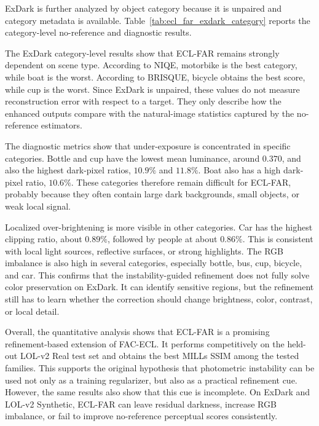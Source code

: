 ExDark is further analyzed by object category because it is unpaired and category metadata is available. Table~\ref{tab:ecl_far_exdark_category} reports the category-level no-reference and diagnostic results.



The ExDark category-level results show that ECL-FAR remains strongly dependent on scene type. According to NIQE, motorbike is the best category, while boat is the worst. According to BRISQUE, bicycle obtains the best score, while cup is the worst. Since ExDark is unpaired, these values do not measure reconstruction error with respect to a target. They only describe how the enhanced outputs compare with the natural-image statistics captured by the no-reference estimators.

The diagnostic metrics show that under-exposure is concentrated in specific categories. Bottle and cup have the lowest mean luminance, around $0.370$, and also the highest dark-pixel ratios, $10.9\%$ and $11.8\%$. Boat also has a high dark-pixel ratio, $10.6\%$. These categories therefore remain difficult for ECL-FAR, probably because they often contain large dark backgrounds, small objects, or weak local signal.

Localized over-brightening is more visible in other categories. Car has the highest clipping ratio, about $0.89\%$, followed by people at about $0.86\%$. This is consistent with local light sources, reflective surfaces, or strong highlights. The RGB imbalance is also high in several categories, especially bottle, bus, cup, bicycle, and car. This confirms that the instability-guided refinement does not fully solve color preservation on ExDark. It can identify sensitive regions, but the refinement still has to learn whether the correction should change brightness, color, contrast, or local detail.

Overall, the quantitative analysis shows that ECL-FAR is a promising refinement-based extension of FAC-ECL. It performs competitively on the held-out LOL-v2 Real test set and obtains the best MILLs SSIM among the tested families. This supports the original hypothesis that photometric instability can be used not only as a training regularizer, but also as a practical refinement cue. However, the same results also show that this cue is incomplete. On ExDark and LOL-v2 Synthetic, ECL-FAR can leave residual darkness, increase RGB imbalance, or fail to improve no-reference perceptual scores consistently.

